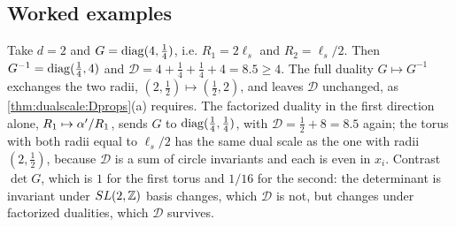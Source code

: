 \subsection{Worked examples}

\begin{example}\label{ex:dualscale:rect}
Take $d=2$ and $G=\operatorname{diag}(4,\tfrac14)$, i.e. $R_1=2\ell_s$ and $R_2=\ell_s/2$. Then
$G^{-1}=\operatorname{diag}(\tfrac14,4)$ and $\mathcal D=4+\tfrac14+\tfrac14+4=8.5\ge4$. The full duality
$G\mapsto G^{-1}$ exchanges the two radii, $(2,\tfrac12)\mapsto(\tfrac12,2)$, and leaves
$\mathcal D$ unchanged, as \cref{thm:dualscale:Dprops}(a) requires. The factorized duality in
the first direction alone, $R_1\mapsto\alpha'/R_1$, sends $G$ to $\operatorname{diag}(\tfrac14,\tfrac14)$, with
$\mathcal D=\tfrac12+8=8.5$ again; the torus with both radii equal to $\ell_s/2$ has the same
dual scale as the one with radii $(2,\tfrac12)$, because $\mathcal D$ is a sum of circle
invariants and each is even in $x_i$. Contrast $\det G$, which is $1$ for the first torus and
$1/16$ for the second: the determinant is invariant under $SL(2,\mathbb{Z})$ basis changes, which
$\mathcal D$ is not, but changes under factorized dualities, which $\mathcal D$ survives.
\end{example}


